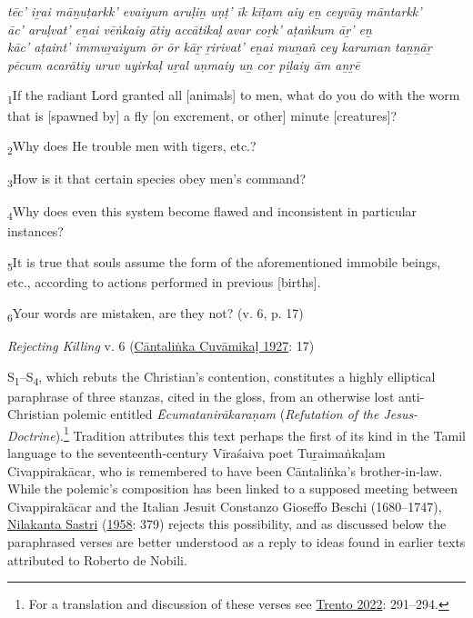 \begin{pullquote}\raggedright
      \emph{tēc’ iṟai māṉuṭarkk’ evaiyum aruḷiṉ uṇṭ’ īk kīṭam aiy eṉ ceyvāy māntarkk’}\\
\emph{āc’ aruḷvat’ eṉai vēṅkaiy ātiy accātikaḷ avar coṟk’ aṭaṅkum āṟ’ eṉ}\\
\emph{kāc’ aṭaint’ immuṟaiyum ōr ōr kāṟ ṟirivat’ eṉai muṉañ cey karuman taṉṉāṟ}\\
\emph{pēcum acarātiy uruv uyirkaḷ uṟal uṇmaiy uṉ coṟ piḻaiy ām aṉṟē}
\end{pullquote}
      
\begin{pullquote}
\textsubscript{1}If the radiant Lord granted all [animals] to men, what do you do with the worm that is [spawned by] a fly [on excrement, or other] minute [creatures]? \medskip


\textsubscript{2}Why does He trouble men with tigers, etc.?\medskip


\textsubscript{3}How is it that certain species obey men’s command?\medskip


\textsubscript{4}Why does even this system become flawed and inconsistent in particular instances? \medskip


\textsubscript{5}It is true that souls assume the form of the aforementioned immobile beings, etc., according to actions performed in previous [births].\medskip


\textsubscript{6}Your words are mistaken, are they not? (v. 6, p. 17)


\medskip\hfill\begin{minipage}{0.9\textwidth}\small\hfill
\emph{Rejecting Killing} v. 6  (\hyperref[CantalinkaCuvamikal1927]{Cāntaliṅka Cuvāmikaḷ 1927}: 17)\end{minipage}\hspace{2em}
\end{pullquote}

S\textsubscript{1}–S\textsubscript{4}, which rebuts the Christian’s contention, constitutes a highly elliptical paraphrase of three stanzas, cited in the gloss, from an otherwise lost anti-Christian polemic entitled \emph{{Ēcumatanirākaraṇam}} (\emph{Refutation of the Jesus-Doctrine}).\footnote{%
For a translation and discussion of these verses see \hyperref[Trento2022]{Trento 2022}: 291–294.
}
 Tradition attributes this text  \Dash  perhaps the first of its kind in the Tamil language  \Dash  to the seventeenth-century Vīraśaiva poet Tuṟaimaṅkaḷam Civappirakācar, who is remembered to have been Cāntaliṅka’s brother-in-law. While the polemic’s composition has been linked to a supposed meeting between Civappirakācar and the Italian Jesuit Constanzo Gioseffo Beschi (1680–1747), \hyperref[NilakantaSastri1958]{Nilakanta Sastri} (\hyperref[NilakantaSastri1958]{1958}: 379) rejects this possibility, and as discussed below the paraphrased verses are better understood as a reply to ideas found in earlier texts attributed to Roberto de Nobili. 


